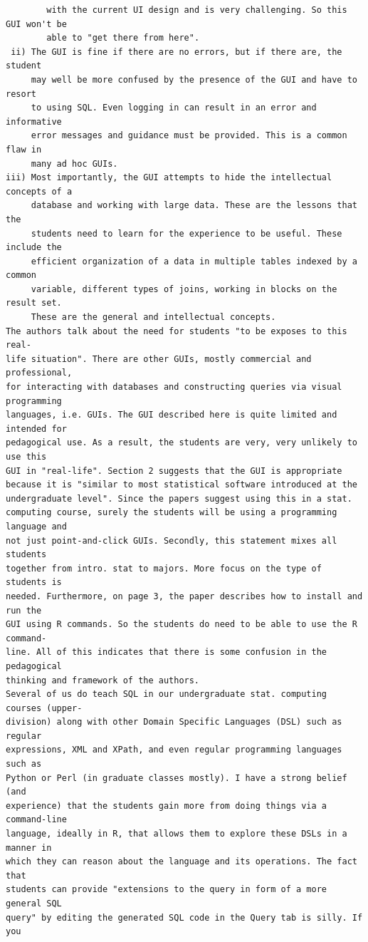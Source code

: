 \documentclass[11pt]{tise_style}
\begin{document}
\begin{verbatim}
        with the current UI design and is very challenging. So this GUI won't be
        able to "get there from here".
 ii) The GUI is fine if there are no errors, but if there are, the student
     may well be more confused by the presence of the GUI and have to resort
     to using SQL. Even logging in can result in an error and informative
     error messages and guidance must be provided. This is a common flaw in
     many ad hoc GUIs.
iii) Most importantly, the GUI attempts to hide the intellectual concepts of a
     database and working with large data. These are the lessons that the
     students need to learn for the experience to be useful. These include the
     efficient organization of a data in multiple tables indexed by a common
     variable, different types of joins, working in blocks on the result set.
     These are the general and intellectual concepts.
The authors talk about the need for students "to be exposes to this real-
life situation". There are other GUIs, mostly commercial and professional,
for interacting with databases and constructing queries via visual programming
languages, i.e. GUIs. The GUI described here is quite limited and intended for
pedagogical use. As a result, the students are very, very unlikely to use this
GUI in "real-life". Section 2 suggests that the GUI is appropriate
because it is "similar to most statistical software introduced at the
undergraduate level". Since the papers suggest using this in a stat.
computing course, surely the students will be using a programming language and
not just point-and-click GUIs. Secondly, this statement mixes all students
together from intro. stat to majors. More focus on the type of students is
needed. Furthermore, on page 3, the paper describes how to install and run the
GUI using R commands. So the students do need to be able to use the R command-
line. All of this indicates that there is some confusion in the pedagogical
thinking and framework of the authors.
Several of us do teach SQL in our undergraduate stat. computing courses (upper-
division) along with other Domain Specific Languages (DSL) such as regular
expressions, XML and XPath, and even regular programming languages such as
Python or Perl (in graduate classes mostly). I have a strong belief (and
experience) that the students gain more from doing things via a command-line
language, ideally in R, that allows them to explore these DSLs in a manner in
which they can reason about the language and its operations. The fact that
students can provide "extensions to the query in form of a more general SQL
query" by editing the generated SQL code in the Query tab is silly. If you

\end{verbatim}
\end{document}
